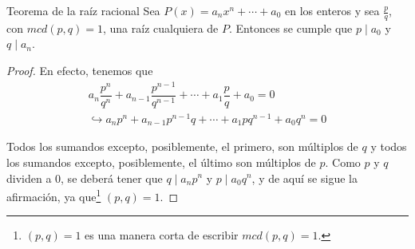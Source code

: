 \begin{section-theorem.tcb}{Teorema de la raíz racional}{}
    Sea $P(x) = a_n x^n + \cdots + a_0$ en los enteros y sea $\frac{p}{q}$, con $mcd(p, q) = 1$, una raíz cualquiera de $P$.
    Entonces se cumple que $p \mid a_0$ y $q \mid a_n$.
\end{section-theorem.tcb}
\begin{proof}
    En efecto, tenemos que
    \begin{gather*}
        a_n \dfrac{p^n}{q^n} + a_{n - 1} \dfrac{p^{n - 1}}{q^{n - 1}} + \cdots + a_1 \dfrac{p}{q} + a_0  = 0 \\
        \hookrightarrow a_n p^n + a_{n - 1}p^{n - 1}q + \cdots + a_1 p q^{n - 1} + a_0 q^n = 0
    \end{gather*}

    Todos los sumandos excepto, posiblemente, el primero, son múltiplos de $q$ y todos los sumandos excepto, posiblemente, el último son múltiplos de $p$.
    Como $p$ y $q$ dividen a 0, se deberá tener que $q \mid a_n p^n$ y $p \mid a_0 q^n$, y de aquí se sigue la afirmación, ya que\footnote{$(p, q) =  1$ es una manera corta de escribir $mcd(p, q) = 1$.} $(p, q) = 1$.
\end{proof}


